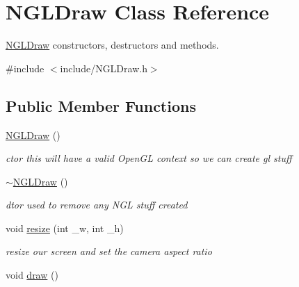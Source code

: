 \hypertarget{classNGLDraw}{
\section{NGLDraw Class Reference}
\label{classNGLDraw}
}


\hyperlink{classNGLDraw}{NGLDraw} constructors, destructors and methods.  


{\ttfamily \#include $<$include/NGLDraw.h$>$}\subsection*{Public Member Functions}
\begin{DoxyCompactItemize}
\item 
\hypertarget{classNGLDraw_ad656ac3d12043d9fbb59985db83e5b52}{
\hyperlink{classNGLDraw_ad656ac3d12043d9fbb59985db83e5b52}{NGLDraw} ()}
\label{classNGLDraw_ad656ac3d12043d9fbb59985db83e5b52}

\begin{DoxyCompactList}\small\item\em ctor this will have a valid OpenGL context so we can create gl stuff \item\end{DoxyCompactList}\item 
\hypertarget{classNGLDraw_af711def4043fa15686998fca20f0697b}{
\hyperlink{classNGLDraw_af711def4043fa15686998fca20f0697b}{$\sim$NGLDraw} ()}
\label{classNGLDraw_af711def4043fa15686998fca20f0697b}

\begin{DoxyCompactList}\small\item\em dtor used to remove any NGL stuff created \item\end{DoxyCompactList}\item 
void \hyperlink{classNGLDraw_ae5151dc189fd5de5649b72c5e76bcf47}{resize} (int \_\-w, int \_\-h)
\begin{DoxyCompactList}\small\item\em resize our screen and set the camera aspect ratio \item\end{DoxyCompactList}\item 
\hypertarget{classNGLDraw_aec8a377329da67db1e2ef007bd27f026}{
void \hyperlink{classNGLDraw_aec8a377329da67db1e2ef007bd27f026}{draw} ()}
\label{classNGLDraw_aec8a377329da67db1e2ef007bd27f026}


\end{DoxyCompactItemize}

